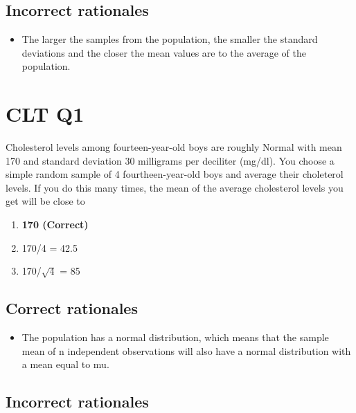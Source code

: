 \documentclass[letterpaper,12pt,twoside,printwatermark=false]{pinp}
\providecommand{\tightlist}{%
  \setlength{\itemsep}{0pt}\setlength{\parskip}{0pt}}
\begin{document}
\hypertarget{incorrect-rationales-1}{%
\subsection{Incorrect rationales}\label{incorrect-rationales-1}}

\begin{itemize}
\tightlist
\item
  The larger the samples from the population, the smaller the standard
  deviations and the closer the mean values are to the average of the
  population.
\end{itemize}

\hypertarget{clt-q1}{%
\section{CLT Q1}\label{clt-q1}}

Cholesterol levels among fourteen-year-old boys are roughly Normal with
mean 170 and standard deviation 30 milligrams per deciliter (mg/dl). You
choose a simple random sample of 4 fourtheen-year-old boys and average
their choleterol levels. If you do this many times, the mean of the
average cholesterol levels you get will be close to

\begin{enumerate}
\def\labelenumi{\alph{enumi})}
\tightlist
\item
  \textbf{170 (Correct)}
\item
  170/4 = 42.5
\item
  170/\(\sqrt{4}\) = 85
\end{enumerate}

\hypertarget{correct-rationales-2}{%
\subsection{Correct rationales}\label{correct-rationales-2}}

\begin{itemize}
\tightlist
\item
  The population has a normal distribution, which means that the sample
  mean of n independent observations will also have a normal
  distribution with a mean equal to mu.
\end{itemize}

\hypertarget{incorrect-rationales-2}{%
\subsection{Incorrect rationales}\label{incorrect-rationales-2}}
\end{document}

